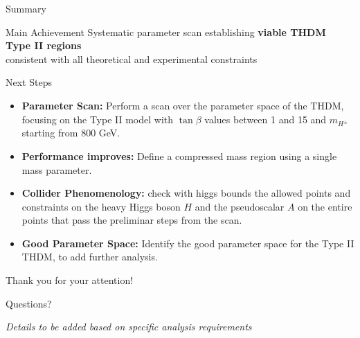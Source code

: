 \documentclass{../bredelebeamer}
\begin{document}
\begin{frame}{Summary}
    \begin{exampleblock}{Main Achievement}
        \centering
        Systematic parameter scan establishing \textbf{viable THDM Type II regions} \\
        consistent with all theoretical and experimental constraints
    \end{exampleblock}
\end{frame}

\begin{frame}{Next Steps}
    \begin{itemize}
        \item \textbf{Parameter Scan:} Perform a scan over the parameter space of the THDM, focusing on the Type II model with $\tan\beta$ values between 1 and 15 and $m_{H^\pm}$ starting from 800 GeV.\vfill
        \item \textbf{Performance improves:} Define a compressed mass region using a single mass parameter. \vfill
        \item \textbf{Collider Phenomenology:} check with higgs bounds the allowed points and constraints on the heavy Higgs boson $H$ and the pseudoscalar $A$ on the entire points that pass the preliminar steps from the scan. \vfill
        \item \textbf{Good Parameter Space:} Identify the good parameter space for the Type II THDM, to add further analysis.
    \end{itemize}
\end{frame}
\begin{frame}
    \begin{center}
        {\Huge Thank you for your attention!}
        
        \vfill
        
        {\Large Questions?}
        
        \vfill
        
        \textit{Details to be added based on specific analysis requirements}
    \end{center}
\end{frame}

\end{document}
